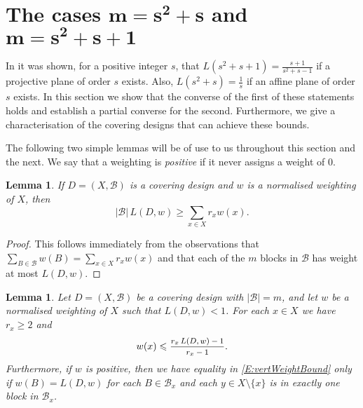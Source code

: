 \documentclass[11pt]{article}
\newtheorem{Lemma}[Theorem]{Lemma}
\theoremstyle{definition}
\renewcommand{\leq}{\leqslant}
\renewcommand{\geq}{\geqslant}
\newcommand{\B}{{\ensuremath{\mathcal{B}}}}
\begin{document}
\section{The cases \texorpdfstring{$\bm{m=s^2+s}$}{m=s2+s} and \texorpdfstring{$\bm{m=s^2+s+1}$}{m=s2+s+1}} \label{S:projAff}

In \cite{HalKelTia} it was shown, for a positive integer $s$, that $L(s^2+s+1)=\frac{s+1}{s^2+s-1}$ if a projective plane of order $s$ exists. Also, $L(s^2+s)=\frac{1}{s}$ if an affine plane of order $s$ exists. In this section we show that the converse of the first of these statements holds and establish a partial converse for the second. Furthermore, we give a characterisation of the covering designs that can achieve these bounds.

The following two simple lemmas will be of use to us throughout this section and the next. We say that a weighting is \emph{positive} if it never assigns a weight of 0.

\begin{Lemma}\label{L:avWeightBound}
If $D=(X,\B)$ is a covering design and $w$ is a normalised weighting of $X$, then
\[|\B|\,L(D,w) \geq \sum_{x \in X}r_xw(x).\]
\end{Lemma}

\begin{proof}
This follows immediately from the observations that $\sum_{B \in \B}w(B) = \sum_{x \in X}r_xw(x)$ and that each of the $m$ blocks in $\B$ has weight at most $L(D,w)$.
\end{proof}

\begin{Lemma}\label{L:maxWeight}
Let $D=(X,\B)$ be a covering design with $|\B|=m$, and let $w$ be a normalised weighting of $X$ such that $L(D,w)<1$. For each $x \in X$ we have $r_x \geq 2$ and
\begin{equation}\label{E:vertWeightBound}
w(x) \leq \mfrac{r_x\,L(D,w)-1}{r_x-1}.
\end{equation}
Furthermore, if $w$ is positive, then we have equality in \eqref{E:vertWeightBound} only if $w(B)=L(D,w)$ for each $B \in \B_x$ and each $y \in X \setminus \{x\}$ is in exactly one block in $\B_x$.
\end{Lemma}
\end{document}
